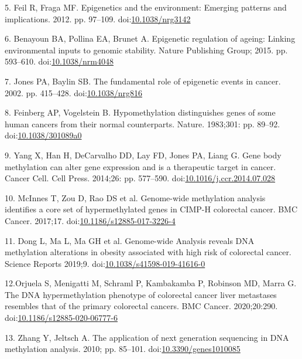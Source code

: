 \documentclass[10pt,letterpaper]{article}
\begin{document}
\leavevmode\hypertarget{ref-Feil2012}{}%
5. Feil R, Fraga MF. Epigenetics and the environment: Emerging patterns
and implications. 2012. pp. 97--109.
doi:\href{https://doi.org/10.1038/nrg3142}{10.1038/nrg3142}

\leavevmode\hypertarget{ref-Benayoun2015}{}%
6. Benayoun BA, Pollina EA, Brunet A. Epigenetic regulation of ageing:
Linking environmental inputs to genomic stability. Nature Publishing
Group; 2015. pp. 593--610.
doi:\href{https://doi.org/10.1038/nrm4048}{10.1038/nrm4048}

\leavevmode\hypertarget{ref-Jones2002}{}%
7. Jones PA, Baylin SB. The fundamental role of epigenetic events in
cancer. 2002. pp. 415--428.
doi:\href{https://doi.org/10.1038/nrg816}{10.1038/nrg816}

\leavevmode\hypertarget{ref-Feinberg1983}{}%
8. Feinberg AP, Vogelstein B. Hypomethylation distinguishes genes of
some human cancers from their normal counterparts. Nature. 1983;301:
pp. 89--92. 
doi:\href{https://doi.org/10.1038/301089a0}{10.1038/301089a0}

\leavevmode\hypertarget{ref-Yang2014}{}%
9. Yang X, Han H, DeCarvalho DD, Lay FD, Jones PA, Liang G. Gene body
methylation can alter gene expression and is a therapeutic target in
cancer. Cancer Cell. Cell Press. 2014;26: pp. 577--590.
doi:\href{https://doi.org/10.1016/j.ccr.2014.07.028}{10.1016/j.ccr.2014.07.028}

\leavevmode\hypertarget{ref-McInnes2017}{}%
10. McInnes T, Zou D, Rao DS et al. Genome-wide methylation analysis identifies 
a core set of hypermethylated genes in CIMP-H colorectal cancer. BMC Cancer. 
2017;17. 
doi:\href{https://doi.org/10.1186/s12885-017-3226-4}{10.1186/s12885-017-3226-4}

\leavevmode\hypertarget{ref-Dong2019}{}%
11. Dong L, Ma L, Ma GH et al. Genome-wide Analysis reveals DNA methylation 
alterations in obesity associated with high risk of colorectal cancer. Science 
Reports 2019;9. 
doi:\href{https://doi.org/10.1038/s41598-019-41616-0}{10.1038/s41598-019-41616-0}

\leavevmode\hypertarget{ref-Orjuela2020}{}%
12.Orjuela S, Menigatti M, Schraml P, Kambakamba P, Robinson MD, Marra G. 
The DNA hypermethylation phenotype of colorectal cancer liver metastases
resembles that of the primary colorectal cancers. BMC Cancer. 2020;20:290. 
doi:\href{https://doi.org/10.1186/s12885-020-06777-6}{10.1186/s12885-020-06777-6}

\leavevmode\hypertarget{ref-Zhang2010}{}%
13. Zhang Y, Jeltsch A. The application of next generation sequencing in
DNA methylation analysis. 2010; pp. 85--101.
doi:\href{https://doi.org/10.3390/genes1010085}{10.3390/genes1010085}
\end{document}
